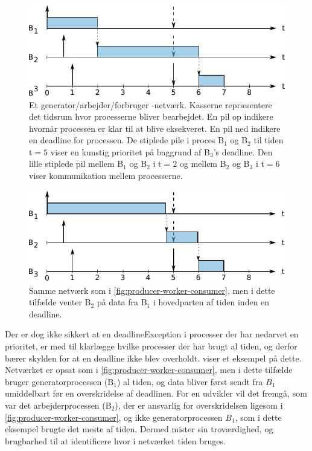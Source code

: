 \begin{figure}
 \begin{center}
  \includegraphics[scale=1.00]{images/producer-worker-consumer}
  \caption{Et generator/arbejder/forbruger -netværk. Kasserne repræsentere det tidsrum hvor processerne bliver bearbejdet. En pil op indikere hvornår processen er klar til at blive eksekveret. En pil ned indikere en deadline for processen. De stiplede pile i proces B$_1$ og B$_2$ til tiden t$=5$ viser en kunstig prioritet på baggrund af B$_3$'s deadline. Den lille stiplede pil mellem  B$_1$ og B$_2$ i t$=2$ og mellem B$_2$ og B$_3$ i t$=6$ viser kommunikation mellem processerne.}
  \label{fig:producer-worker-consumer}
  \end{center}
\end{figure}
\begin{figure}
 \begin{center}
  \includegraphics[scale=1.00]{images/producer-worker-consumer2}
  \caption{Samme netværk som i \autoref{fig:producer-worker-consumer}, men i dette tilfælde venter B$_2$  på data fra B$_1$ i hovedparten af tiden inden en deadline.}
  \label{fig:producer-worker-consumer2}
  \end{center}
\end{figure}


Der er dog ikke sikkert at en deadlineException i processer der har nedarvet en prioritet, er med til klarlægge hvilke processer der har brugt al tiden, og derfor bærer skylden for at en deadline ikke blev overholdt.  viser et eksempel på dette. Netværket er opsat som i \autoref{fig:producer-worker-consumer}, men i dette tilfælde bruger generatorprocessen (B$_1$) al tiden, og data bliver først sendt fra $B_1$ umiddelbart før en overskridelse af deadlinen. For en udvikler  vil det fremgå, som var det arbejderprocessen (B$_2$), der er ansvarlig for overskridelsen ligesom i \autoref{fig:producer-worker-consumer}, og ikke generatorprocessen $B_1$, som i dette eksempel brugte det meste af tiden. Dermed mister  sin troværdighed, og brugbarhed til at identificere hvor i netværket tiden bruges. 

